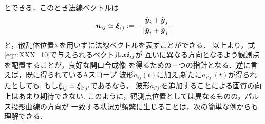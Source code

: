 とできる．このとき法線ベクトルは
\begin{equation}
	\mbox{\boldmath $n$}_{ij} \simeq  
	\mbox{\boldmath $\xi$}_{ij}:=
	-\frac{\hat{\mbox{\boldmath $y$}}_i+\hat{\mbox{\boldmath $y$}}_j}
	{| \hat{\mbox{\boldmath $y$}}_i+\hat{\mbox{\boldmath $y$}}_j|}
	\label{eqn:XXX_10}
\end{equation}
と，散乱体位置$\mbox{\boldmath $z$}$を用いずに法線ベクトルを表すことができる．
以上より，式\ref{eqn:XXX_10}で与えられるベクトル$\mbox{\boldmath $xi$}_{ij}$が
互いに異なる方向となるよう観測点を配置することが，良好な開口合成像
を得るための一つの指針となる．逆に言えば，既に得られているAスコープ
波形$a_{ij}(t)$に加え,新たに$a_{i'j'}(t)$が得られたとしても,
もし$\mbox{\boldmath $\xi$}_{ij}\simeq \mbox{\boldmath $\xi$}_{i'j'}$であるなら，
波形$a_{i'j'}$を追加することによる画質の向上はあまり期待できない.
このように，観測点位置としては異なるものの，パルス投影曲線の方向が
一致する状況が頻繁に生じることは，次の簡単な例からも理解できる．
%

